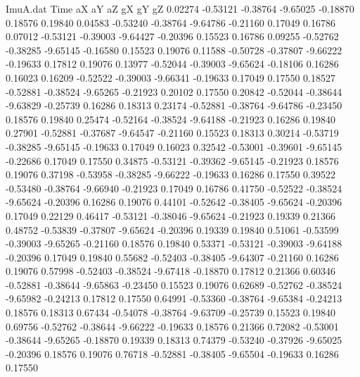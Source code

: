 \begin{filecontents}{ImuA.dat}
Time aX aY aZ gX gY gZ
   0.02274   -0.53121   -0.38764   -9.65025   -0.18870    0.18576    0.19840
   0.04583   -0.53240   -0.38764   -9.64786   -0.21160    0.17049    0.16786
   0.07012   -0.53121   -0.39003   -9.64427   -0.20396    0.15523    0.16786
   0.09255   -0.52762   -0.38285   -9.65145   -0.16580    0.15523    0.19076
   0.11588   -0.50728   -0.37807   -9.66222   -0.19633    0.17812    0.19076
   0.13977   -0.52044   -0.39003   -9.65624   -0.18106    0.16286    0.16023
   0.16209   -0.52522   -0.39003   -9.66341   -0.19633    0.17049    0.17550
   0.18527   -0.52881   -0.38524   -9.65265   -0.21923    0.20102    0.17550
   0.20842   -0.52044   -0.38644   -9.63829   -0.25739    0.16286    0.18313
   0.23174   -0.52881   -0.38764   -9.64786   -0.23450    0.18576    0.19840
   0.25474   -0.52164   -0.38524   -9.64188   -0.21923    0.16286    0.19840
   0.27901   -0.52881   -0.37687   -9.64547   -0.21160    0.15523    0.18313
   0.30214   -0.53719   -0.38285   -9.65145   -0.19633    0.17049    0.16023
   0.32542   -0.53001   -0.39601   -9.65145   -0.22686    0.17049    0.17550
   0.34875   -0.53121   -0.39362   -9.65145   -0.21923    0.18576    0.19076
   0.37198   -0.53958   -0.38285   -9.66222   -0.19633    0.16286    0.17550
   0.39522   -0.53480   -0.38764   -9.66940   -0.21923    0.17049    0.16786
   0.41750   -0.52522   -0.38524   -9.65624   -0.20396    0.16286    0.19076
   0.44101   -0.52642   -0.38405   -9.65624   -0.20396    0.17049    0.22129
   0.46417   -0.53121   -0.38046   -9.65624   -0.21923    0.19339    0.21366
   0.48752   -0.53839   -0.37807   -9.65624   -0.20396    0.19339    0.19840
   0.51061   -0.53599   -0.39003   -9.65265   -0.21160    0.18576    0.19840
   0.53371   -0.53121   -0.39003   -9.64188   -0.20396    0.17049    0.19840
   0.55682   -0.52403   -0.38405   -9.64307   -0.21160    0.16286    0.19076
   0.57998   -0.52403   -0.38524   -9.67418   -0.18870    0.17812    0.21366
   0.60346   -0.52881   -0.38644   -9.65863   -0.23450    0.15523    0.19076
   0.62689   -0.52762   -0.38524   -9.65982   -0.24213    0.17812    0.17550
   0.64991   -0.53360   -0.38764   -9.65384   -0.24213    0.18576    0.18313
   0.67434   -0.54078   -0.38764   -9.63709   -0.25739    0.15523    0.19840
   0.69756   -0.52762   -0.38644   -9.66222   -0.19633    0.18576    0.21366
   0.72082   -0.53001   -0.38644   -9.65265   -0.18870    0.19339    0.18313
   0.74379   -0.53240   -0.37926   -9.65025   -0.20396    0.18576    0.19076
   0.76718   -0.52881   -0.38405   -9.65504   -0.19633    0.16286    0.17550

\end{filecontents}

